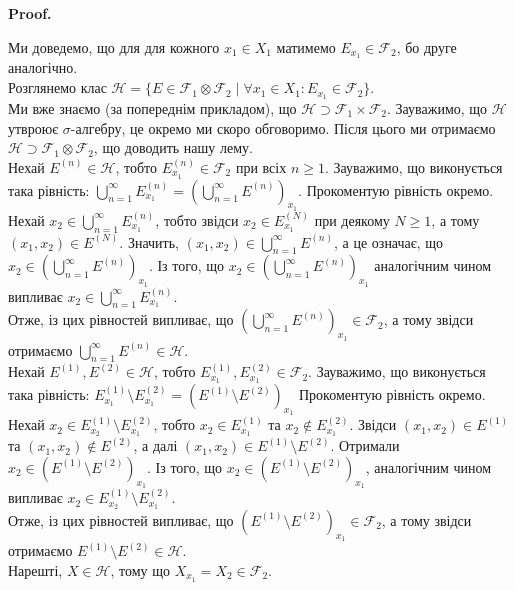 \documentclass[a4paper, 10pt]{article}
\makeatletter
\theoremstyle{theoremdd}
\renewenvironment{proof}[1][Proof.\\]{\par
\pushQED{\hfill \qed}%
\normalfont \topsep6\p@\@plus6\p@\relax
\trivlist
\item\relax
{\bfseries
#1\@addpunct{.}}\hspace\labelsep\ignorespaces
}{%
\popQED\endtrivlist\@endpefalse
}
\makeatother
\begin{document}
\begin{proof}
Ми доведемо, що для для кожного $x_1 \in X_1$ матимемо $E_{x_1} \in \mathcal{F}_2$, бо друге аналогічно.\\
Розглянемо клас $\mathcal{H} = \{ E \in \mathcal{F}_1 \otimes \mathcal{F}_2 \mid \forall x_1 \in X_1: E_{x_1} \in \mathcal{F}_2\}$.\\
Ми вже знаємо (за попереднім прикладом), що $\mathcal{H} \supset \mathcal{F}_1 \times \mathcal{F}_2$. Зауважимо, що $\mathcal{H}$ утвроює $\sigma$-алгебру, це окремо ми скоро обговоримо. Після цього ми отримаємо $\mathcal{H} \supset \mathcal{F}_1 \otimes \mathcal{F}_2$, що доводить нашу лему.\\
Нехай $E^{(n)} \in \mathcal{H}$, тобто $E^{(n)}_{x_1} \in \mathcal{F}_2$ при всіх $n \geq 1$. Зауважимо, що виконується така рівність: $\displaystyle\bigcup_{n=1}^\infty E^{(n)}_{x_1} = \left( \bigcup_{n=1}^\infty E^{(n)} \right)_{x_1}$. Прокоментую рівність окремо.\\
Нехай $x_2 \in \displaystyle\bigcup_{n=1}^\infty E_{x_1}^{(n)}$, тобто звідси $x_2 \in E^{(N)}_{x_1}$ при деякому $N \geq 1$, а тому $(x_1,x_2) \in E^{(N)}$. Значить, $(x_1,x_2) \in \displaystyle\bigcup_{n=1}^\infty E^{(n)}$, а це означає, що $\displaystyle x_2 \in \left( \bigcup_{n=1}^\infty E^{(n)} \right)_{x_1}$. Із того, що $\displaystyle x_2 \in \left( \bigcup_{n=1}^\infty E^{(n)} \right)_{x_1}$ аналогічним чином випливає $x_2 \in \displaystyle\bigcup_{n=1}^\infty E_{x_1}^{(n)}$.\\
Отже, із цих рівностей випливає, що $\displaystyle\left( \bigcup_{n=1}^\infty E^{(n)} \right)_{x_1} \in \mathcal{F}_2$, а тому звідси отримаємо $\displaystyle\bigcup_{n=1}^\infty E^{(n)} \in \mathcal{H}$.\\
Нехай $E^{(1)},E^{(2)} \in \mathcal{H}$, тобто $E_{x_1}^{(1)}, E_{x_1}^{(2)} \in \mathcal{F}_2$. Зауважимо, що виконується така рівність: $E^{(1)}_{x_1} \setminus E^{(2)}_{x_1} = (E^{(1)} \setminus E^{(2)})_{x_1}$ Прокоментую рівність окремо.\\
Нехай $x_2 \in E^{(1)}_{x_2} \setminus E^{(2)}_{x_1}$, тобто $x_2 \in E_{x_1}^{(1)}$ та $x_2 \notin E_{x_1}^{(2)}$. Звідси $(x_1,x_2) \in E^{(1)}$ та $(x_1,x_2) \notin E^{(2)}$, а далі $(x_1,x_2) \in E^{(1)} \setminus E^{(2)}$. Отримали $x_2 \in (E^{(1)} \setminus E^{(2)})_{x_1}$. Із того, що $x_2 \in (E^{(1)} \setminus E^{(2)})_{x_1}$, аналогічним чином випливає $x_2 \in E^{(1)}_{x_2} \setminus E^{(2)}_{x_1}$.\\
Отже, із цих рівностей випливає, що $(E^{(1)} \setminus E^{(2)})_{x_1} \in \mathcal{F}_2$, а тому звідси отримаємо $E^{(1)} \setminus E^{(2)} \in \mathcal{H}$.\\
Нарешті, $X \in \mathcal{H}$, тому що $X_{x_1} = X_2 \in \mathcal{F}_2$.
\end{proof}
\end{document}
